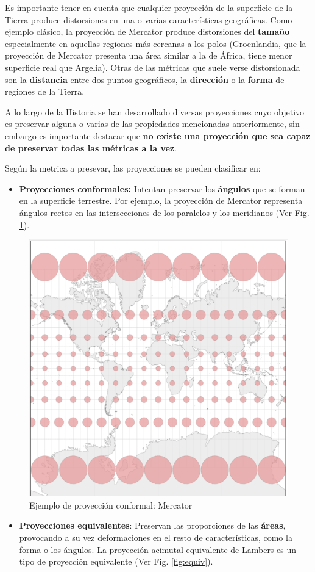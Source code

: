 \documentclass[
]{report}
\providecommand{\tightlist}{%
  \setlength{\itemsep}{0pt}\setlength{\parskip}{0pt}}
\theoremstyle{definition}
\theoremstyle{definition}
\theoremstyle{definition}
\theoremstyle{definition}
\theoremstyle{remark}
\begin{document}
Es importante tener en cuenta que cualquier proyección de la superficie de la
Tierra produce distorsiones en una o varias características geográficas. Como
ejemplo clásico, la proyección de Mercator produce distorsiones del \textbf{tamaño}
especialmente en aquellas regiones más cercanas a los polos (Groenlandia, que la
proyección de Mercator presenta una área similar a la de África, tiene menor
superficie real que Argelia). Otras de las métricas que suele verse
distorsionada son la \textbf{distancia} entre dos puntos geográficos, la
\textbf{dirección} o la \textbf{forma} de regiones de la Tierra.

A lo largo de la Historia se han desarrollado diversas proyecciones cuyo
objetivo es preservar alguna o varias de las propiedades mencionadas
anteriormente, sin embargo es importante destacar que \textbf{no existe una proyección
que sea capaz de preservar todas las métricas a la vez}.

Según la metrica a presevar, las proyecciones se pueden clasificar en:

\begin{itemize}
\tightlist
\item
  \textbf{Proyecciones conformales:} Intentan preservar los \textbf{ángulos} que se
  forman en la superficie terrestre. Por ejemplo, la proyección de Mercator
  representa ángulos rectos en las intersecciones de los paralelos y los
  meridianos (Ver Fig. \ref{fig:conform}).
\end{itemize}

\begin{figure}

{\centering \includegraphics[width=0.3\linewidth]{img/conform} 

}

\caption{Ejemplo de proyección conformal: Mercator}\label{fig:conform}
\end{figure}

\begin{itemize}
\tightlist
\item
  \textbf{Proyecciones equivalentes}: Preservan las proporciones de las \textbf{áreas},
  provocando a su vez deformaciones en el resto de características, como la
  forma o los ángulos. La proyección acimutal equivalente de Lambers es un
  tipo de proyección equivalente (Ver Fig. \ref{fig:equiv}).
\end{itemize}
\end{document}
